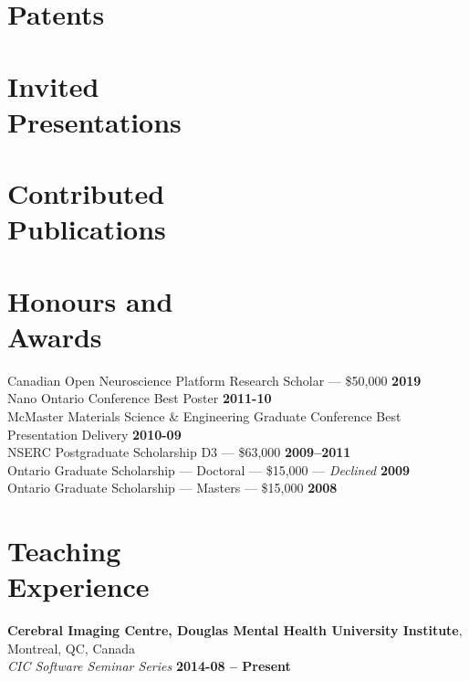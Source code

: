 \documentclass[margin1,line,canadian]{resume}
\newcommand{\compactbib}{\small\setlength{\bibitemsep}{0pt}\toggletrue{compactbib}}
\begin{document}
\begin{resume}
 \section{\mysidestyle{}Patents}
 \begin{refsection}
  \newrefcontext[sorting=ymdnt]
  \nocite{*}
  \printbibliography[heading=none]
 \end{refsection}
 \section{\mysidestyle{}Invited\\Presentations}
 \begin{refsection}
  \newrefcontext[sorting=ymdnt]
  \nocite{*}
  \printbibliography[heading=none]
 \end{refsection}
 \section{\mysidestyle{}Contributed\\Publications}
 \begin{refsection}
  \newrefcontext[sorting=ymdnt]
  \nocite{*}
  \begingroup\compactbib
  \printbibliography[heading=none]
  \endgroup
 \end{refsection}

 \section{\mysidestyle{}Honours and\\Awards}
 Canadian Open Neuroscience Platform Research Scholar --- \$50,000 \hfill \textbf{2019}\\
 Nano Ontario Conference Best Poster \hfill \textbf{2011-10}\\%
 McMaster Materials Science \& Engineering Graduate Conference Best Presentation Delivery \hfill \textbf{2010-09}\\%
 NSERC Postgraduate Scholarship D3 --- \$63,000 \hfill \textbf{2009--2011}\\%
 Ontario Graduate Scholarship --- Doctoral --- \$15,000 --- \textsl{Declined} \hfill \textbf{2009} \\%
 Ontario Graduate Scholarship --- Masters --- \$15,000 \hfill \textbf{2008}

 \section{\mysidestyle{}Teaching\\Experience}
 \textbf{Cerebral Imaging Centre, Douglas Mental Health University Institute}, Montreal, QC, Canada \\%
 \textsl{CIC Software Seminar Series} \hfill \textbf{2014-08 -- Present}


\end{resume}
\end{document}
